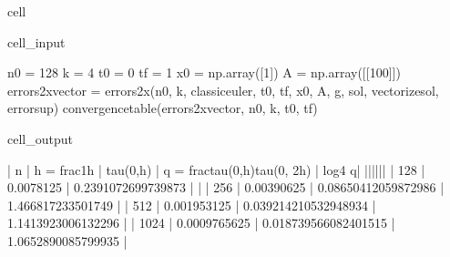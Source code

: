\documentclass[letterpaper,10pt,english]{jupyterBook}
\begin{document}
\begin{sphinxuseclass}{cell}\begin{sphinxVerbatimInput}

\begin{sphinxuseclass}{cell_input}
\begin{sphinxVerbatim}[commandchars=\\\{\}]
n0 = 128
k = 4
t0 = 0
tf = 1
x0 = np.array([1])
A = np.array([[100]])
errors\PYGZus{}2x\PYGZus{}vector = errors\PYGZus{}2x(n0, k, classic\PYGZus{}euler, t0, tf, x0, A, g, sol, vectorize\PYGZus{}sol, error\PYGZus{}sup)
convergence\PYGZus{}table(errors\PYGZus{}2x\PYGZus{}vector, n0, k, t0, tf)
\end{sphinxVerbatim}

\end{sphinxuseclass}\end{sphinxVerbatimInput}
\begin{sphinxVerbatimOutput}

\begin{sphinxuseclass}{cell_output}
\begin{sphinxVerbatim}[commandchars=\\\{\}]
| n | h = \PYGZdl{}\PYGZbs{}frac\PYGZob{}1\PYGZcb{}\PYGZob{}h\PYGZcb{}\PYGZdl{} | \PYGZdl{}\PYGZbs{}tau(0,h)\PYGZdl{} | q = \PYGZdl{}\PYGZbs{}frac\PYGZob{}tau(0,h)\PYGZcb{}\PYGZob{}tau(0, 2h)\PYGZcb{}\PYGZdl{} | \PYGZdl{}log\PYGZus{}4 \PYGZca{}q\PYGZdl{}|
|\PYGZhy{}\PYGZhy{}\PYGZhy{}|\PYGZhy{}\PYGZhy{}\PYGZhy{}\PYGZhy{}\PYGZhy{}\PYGZhy{}\PYGZhy{}\PYGZhy{}\PYGZhy{}\PYGZhy{}\PYGZhy{}\PYGZhy{}\PYGZhy{}\PYGZhy{}\PYGZhy{}\PYGZhy{}\PYGZhy{}|\PYGZhy{}\PYGZhy{}\PYGZhy{}\PYGZhy{}\PYGZhy{}\PYGZhy{}\PYGZhy{}\PYGZhy{}\PYGZhy{}\PYGZhy{}\PYGZhy{}|\PYGZhy{}\PYGZhy{}\PYGZhy{}\PYGZhy{}\PYGZhy{}\PYGZhy{}\PYGZhy{}\PYGZhy{}\PYGZhy{}\PYGZhy{}\PYGZhy{}\PYGZhy{}\PYGZhy{}\PYGZhy{}\PYGZhy{}\PYGZhy{}\PYGZhy{}\PYGZhy{}\PYGZhy{}\PYGZhy{}\PYGZhy{}\PYGZhy{}\PYGZhy{}\PYGZhy{}\PYGZhy{}\PYGZhy{}\PYGZhy{}\PYGZhy{}\PYGZhy{}\PYGZhy{}\PYGZhy{}\PYGZhy{}\PYGZhy{}|\PYGZhy{}\PYGZhy{}\PYGZhy{}\PYGZhy{}\PYGZhy{}\PYGZhy{}\PYGZhy{}|
 | 128 | 0.0078125 | 0.2391072699739873 | \PYGZhy{} | 
 | 256 | 0.00390625 | 0.08650412059872986 | 1.466817233501749 | 
 | 512 | 0.001953125 | 0.039214210532948934 | 1.1413923006132296 | 
 | 1024 | 0.0009765625 | 0.018739566082401515 | 1.0652890085799935 | 
\end{sphinxVerbatim}

\end{sphinxuseclass}\end{sphinxVerbatimOutput}

\end{sphinxuseclass}
\end{document}
